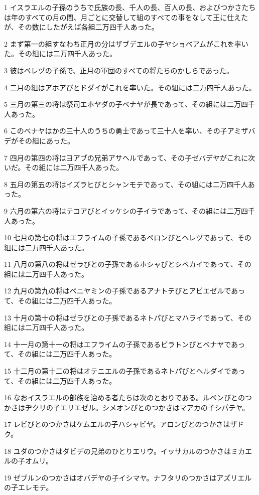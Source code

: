 \par 1 イスラエルの子孫のうちで氏族の長、千人の長、百人の長、およびつかさたちは年のすべての月の間、月ごとに交替して組のすべての事をなして王に仕えたが、その数にしたがえば各組二万四千人あった。
\par 2 まず第一の組すなわち正月の分はザブデエルの子ヤショベアムがこれを率いた。その組には二万四千人あった。
\par 3 彼はペレヅの子孫で、正月の軍団のすべての将たちのかしらであった。
\par 4 二月の組はアホアびとドダイがこれを率いた。その組には二万四千人あった。
\par 5 三月の第三の将は祭司エホヤダの子ベナヤが長であって、その組には二万四千人あった。
\par 6 このベナヤはかの三十人のうちの勇士であって三十人を率い、その子アミザバデがその組にあった。
\par 7 四月の第四の将はヨアブの兄弟アサヘルであって、その子ゼバデヤがこれに次いだ。その組には二万四千人あった。
\par 8 五月の第五の将はイズラヒびとシャンモテであって、その組には二万四千人あった。
\par 9 六月の第六の将はテコアびとイッケシの子イラであって、その組には二万四千人あった。
\par 10 七月の第七の将はエフライムの子孫であるペロンびとヘレヅであって、その組には二万四千人あった。
\par 11 八月の第八の将はゼラびとの子孫であるホシャびとシベカイであって、その組には二万四千人あった。
\par 12 九月の第九の将はベニヤミンの子孫であるアナトテびとアビエゼルであって、その組には二万四千人あった。
\par 13 十月の第十の将はゼラびとの子孫であるネトパびとマハライであって、その組には二万四千人あった。
\par 14 十一月の第十一の将はエフライムの子孫であるピラトンびとベナヤであって、その組には二万四千人あった。
\par 15 十二月の第十二の将はオテニエルの子孫であるネトパびとヘルダイであって、その組には二万四千人あった。
\par 16 なおイスラエルの部族を治める者たちは次のとおりである。ルベンびとのつかさはヂクリの子エリエゼル。シメオンびとのつかさはマアカの子シパテヤ。
\par 17 レビびとのつかさはケムエルの子ハシャビヤ。アロンびとのつかさはザドク。
\par 18 ユダのつかさはダビデの兄弟のひとりエリウ。イッサカルのつかさはミカエルの子オムリ。
\par 19 ゼブルンのつかさはオバデヤの子イシマヤ。ナフタリのつかさはアズリエルの子エレモテ。
